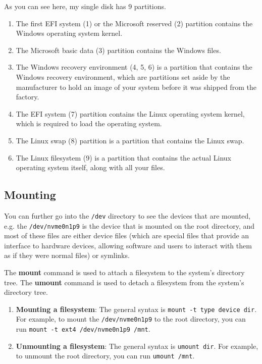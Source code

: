 \documentclass{article}
\theoremstyle{definition}
\begin{document}
  As you can see here, my single disk has 9 partitions. 
  \begin{enumerate} 
    \item The first EFI system (1) or the Microsoft reserved (2) partition contains the Windows operating system kernel. 
    \item The Microsoft basic data (3) partition contains the Windows files.
    \item  The Windows recovery environment (4, 5, 6) is a partition that contains the Windows recovery environment, which are partitions set aside by the manufacturer to hold an image of your system before it was shipped from the factory. 
    \item The EFI system (7) partition contains the Linux operating system kernel, which is required to load the operating system. 
    \item The Linux swap (8) partition is a partition that contains the Linux swap. 
    \item The Linux filesystem (9) is a partition that contains the actual Linux operating system itself, along with all your files.
  \end{enumerate}


  \subsection{Mounting} 

    You can further go into the \texttt{/dev} directory to see the devices that are mounted, e.g. the \texttt{/dev/nvme0n1p9} is the device that is mounted on the root directory, and most of these files are either device files (which are special files that provide an interface to hardware devices, allowing software and users to interact with them as if they were normal files) or symlinks.

    The \textbf{mount} command is used to attach a filesystem to the system's directory tree. The \textbf{umount} command is used to detach a filesystem from the system's directory tree. 

    \begin{enumerate}
      \item \textbf{Mounting a filesystem}: The general syntax is \texttt{mount -t type device dir}. For example, to mount the \texttt{/dev/nvme0n1p9} to the root directory, you can run \texttt{mount -t ext4 /dev/nvme0n1p9 /mnt}. 
      \item \textbf{Unmounting a filesystem}: The general syntax is \texttt{umount dir}. For example, to unmount the root directory, you can run \texttt{umount /mnt}. 
    \end{enumerate}
\end{document}

